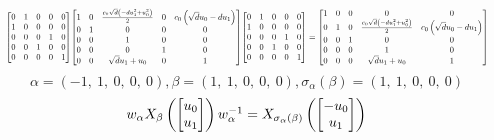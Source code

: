 \documentclass[11pt]{article}
\theoremstyle{definition}
\begin{document}
\[
\scaletoalign{\textwidth}{{\left[\begin{matrix}0 & 1 & 0 & 0 & 0\\1 & 0 & 0 & 0 & 0\\0 & 0 & 0 & 1 & 0\\0 & 0 & 1 & 0 & 0\\0 & 0 & 0 & 0 & 1\end{matrix}\right]} {\left[\begin{matrix}1 & 0 & \frac{c_{0} \sqrt{d} \left(- d u_{1}^{2} + u_{0}^{2}\right)}{2} & 0 & c_{0} \left(\sqrt{d} u_{0} - d u_{1}\right)\\0 & 1 & 0 & 0 & 0\\0 & 0 & 1 & 0 & 0\\0 & 0 & 0 & 1 & 0\\0 & 0 & \sqrt{d} u_{1} + u_{0} & 0 & 1\end{matrix}\right]} {\left[\begin{matrix}0 & 1 & 0 & 0 & 0\\1 & 0 & 0 & 0 & 0\\0 & 0 & 0 & 1 & 0\\0 & 0 & 1 & 0 & 0\\0 & 0 & 0 & 0 & 1\end{matrix}\right]} = {\left[\begin{matrix}1 & 0 & 0 & 0 & 0\\0 & 1 & 0 & \frac{c_{0} \sqrt{d} \left(- d u_{1}^{2} + u_{0}^{2}\right)}{2} & c_{0} \left(\sqrt{d} u_{0} - d u_{1}\right)\\0 & 0 & 1 & 0 & 0\\0 & 0 & 0 & 1 & 0\\0 & 0 & 0 & \sqrt{d} u_{1} + u_{0} & 1\end{matrix}\right]}}
\]
\[
\alpha = \left( -1, \  1, \  0, \  0, \  0\right), \beta = \left( 1, \  1, \  0, \  0, \  0\right), \sigma_{\alpha}(\beta) = \left( 1, \  1, \  0, \  0, \  0\right)
\]
\[
\scaletoalign{\textwidth}{w_{\alpha} X_{\beta}\left(\left[\begin{matrix}u_{0}\\u_{1}\end{matrix}\right]\right) w_{\alpha}^{-1} = X_{\sigma_{\alpha}\left(\beta\right)}\left(\left[\begin{matrix}- u_{0}\\u_{1}\end{matrix}\right]\right)}
\]
\end{document}
